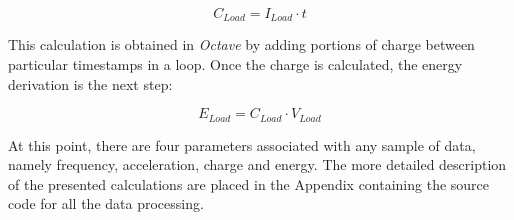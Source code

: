 \documentclass[12pt,a4paper]{article}
\begin{document}
\begin{equation}
	C_{Load} = I_{Load} \cdot t
	\label{eqn:charge}
\end{equation}

This calculation is obtained in \textit{Octave} by adding portions of charge between particular timestamps in a loop. Once the charge is calculated, the energy derivation is the next step:

\begin{equation}
	E_{Load} = C_{Load} \cdot V_{Load}
	\label{eqn:energy}
\end{equation}
\par
At this point, there are four parameters associated with any sample of data, namely frequency, acceleration, charge and energy. The more detailed description of the presented calculations are placed in the Appendix containing the source code for all the data processing. 
\end{document}
